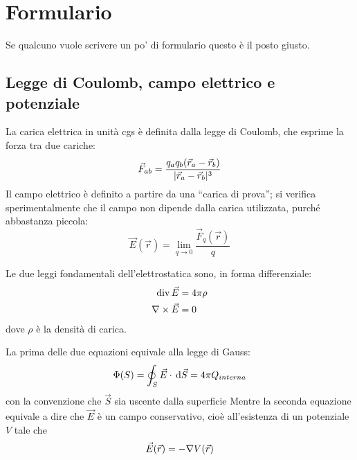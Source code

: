 \documentclass[../main.tex]{subfiles}
\begin{document}
\section{Formulario}
\setcounter{equation}{0}
\renewcommand{\theequation}{F.\arabic{equation}}

Se qualcuno vuole scrivere un po' di formulario questo è il posto giusto.

\subsection{Legge di Coulomb, campo elettrico e potenziale}\label{Preliminari}
La carica elettrica in unità cgs è definita dalla legge di Coulomb, che esprime la forza tra due cariche:
\begin{equation}
  \label{Coulomb}
  \vec F_{ab}=\frac{q_aq_b(\vec r_a-\vec r_b)}{\lvert\vec r_a -\vec r_b\rvert^3}
\end{equation}
Il campo elettrico è definito a partire da una ``carica di prova''; si verifica sperimentalmente che il campo non dipende dalla carica utilizzata, purché abbastanza piccola:
\begin{equation}
  \label{CampoElettrico}
  \vec E(\vec r)=\lim_{q \to 0} \frac{\vec F_q(\vec r)}{q}
\end{equation}

Le due leggi fondamentali dell'elettrostatica sono, in forma differenziale:
\begin{subequations}
  \label{DifferenzialiElettrostatica}
  \begin{align}
    \operatorname{div} \vec E &= 4 \pi \rho\label{GaussDifferenziale}\\
    \nabla\times \vec E &= 0
  \end{align}
\end{subequations}
dove $\rho$ è la densità di carica.

La prima delle due equazioni equivale alla legge di Gauss:
\begin{equation}\label{GaussIntegrale}
	\Phi(S)= \oint_S \vec E \cdot \,\mathrm d \vec S=4\pi Q_{interna}\\
\end{equation}
con la convenzione che $\vec S$ sia uscente dalla superficie
Mentre la seconda equazione equivale a dire che $\vec E$ è un campo conservativo, cioè all'esistenza di un potenziale $V$ tale che
\begin{equation}
  \label{Potenziale}
  \vec E(\vec r) = - \nabla V(\vec r)
\end{equation}
\end{document}
